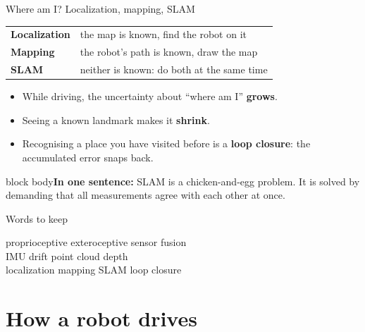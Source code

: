 \documentclass[aspectratio=169]{beamer}
\newcommand{\takeaway}[1]{\vspace{2mm}\begin{beamercolorbox}[rounded=true,sep=4pt,wd=\textwidth]{block body}\footnotesize\textbf{In one sentence:} #1\end{beamercolorbox}}
\newcommand{\wordsframe}[1]{\begin{frame}{Words to keep}\begin{center}\Large #1\end{center}\end{frame}}
\begin{document}
\begin{frame}{Where am I? Localization, mapping, SLAM}
	\begin{center}
		\begin{tabular}{ll}
			\toprule
			\textbf{Localization} & the map is known, find the robot on it \\
			\textbf{Mapping} & the robot's path is known, draw the map \\
			\textbf{SLAM} & neither is known: do both at the same time \\
			\bottomrule
		\end{tabular}
	\end{center}
	\vspace{3mm}
	\begin{itemize}\footnotesize
		\item While driving, the uncertainty about ``where am I'' \textbf{grows}.
		\item Seeing a known landmark makes it \textbf{shrink}.
		\item Recognising a place you have visited before is a \textbf{loop closure}: the accumulated error snaps back.
	\end{itemize}
	\takeaway{SLAM is a chicken-and-egg problem. It is solved by demanding that all measurements agree with each other at once.}
\end{frame}

\wordsframe{proprioceptive \quad exteroceptive \quad sensor fusion \\[3mm] IMU \quad drift \quad point cloud \quad depth \\[3mm] localization \quad mapping \quad SLAM \quad loop closure}

\section{How a robot drives}
\end{document}

